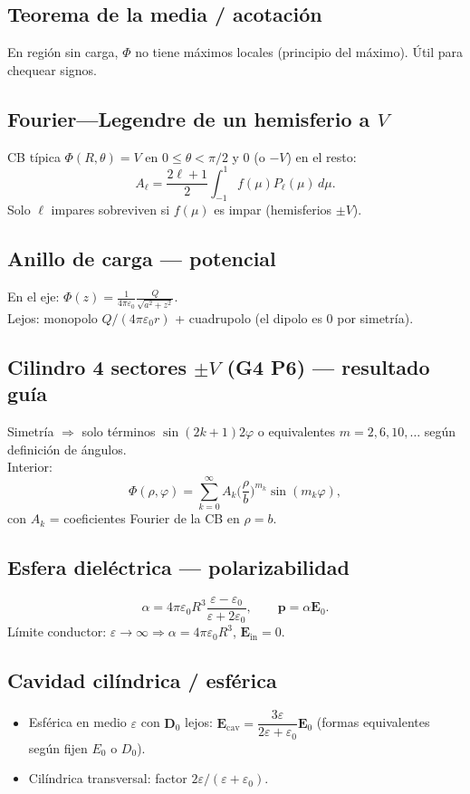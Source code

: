 \documentclass[10pt,a4paper]{article}
\newcommand{\vect}[1]{\mathbf{#1}}
\newcommand{\eps}{\varepsilon}
\newcommand{\epso}{\varepsilon_0}
\begin{document}
\subsection{Teorema de la media / acotación}
En región sin carga, $\Phi$ no tiene máximos locales (principio del máximo). Útil para chequear signos.

\subsection{Fourier---Legendre de un hemisferio a $V$}
CB típica $\Phi(R,\theta)=V$ en $0\le\theta<\pi/2$ y $0$ (o $-V$) en el resto:
\[
A_\ell=\frac{2\ell+1}{2}\int_{-1}^1 f(\mu)P_\ell(\mu)\,d\mu.
\]
Solo $\ell$ impares sobreviven si $f(\mu)$ es impar (hemisferios $\pm V$).

\subsection{Anillo de carga --- potencial}
En el eje: $\Phi(z)=\frac{1}{4\pi\epso}\frac{Q}{\sqrt{a^2+z^2}}$.\\
Lejos: monopolo $Q/(4\pi\epso r)$ + cuadrupolo (el dipolo es 0 por simetría).

\subsection{Cilindro 4 sectores $\pm V$ (G4 P6) --- resultado guía}
Simetría $\Rightarrow$ solo términos $\sin(2k+1)2\varphi$ o equivalentes $m=2,6,10,\ldots$ según definición de ángulos.\\
Interior:
\[
\Phi(\rho,\varphi)=\sum_{k=0}^\infty A_k\Big(\frac{\rho}{b}\Big)^{m_k}\sin(m_k\varphi),
\]
con $A_k$ = coeficientes Fourier de la CB en $\rho=b$.

\subsection{Esfera dieléctrica --- polarizabilidad}
\[
\alpha=4\pi\epso R^3\frac{\eps-\epso}{\eps+2\epso},\qquad\vect{p}=\alpha\vect{E}_0.
\]
Límite conductor: $\eps\to\infty\Rightarrow\alpha=4\pi\epso R^3$, $\vect{E}_{\mathrm{in}}=0$.

\subsection{Cavidad cilíndrica / esférica}
\begin{itemize}
\item Esférica en medio $\eps$ con $\vect{D}_0$ lejos: $\vect{E}_{\mathrm{cav}}=\dfrac{3\eps}{2\eps+\epso}\vect{E}_0$ (formas equivalentes según fijen $E_0$ o $D_0$).
\item Cilíndrica transversal: factor $2\eps/(\eps+\epso)$.
\end{itemize}
\end{document}

